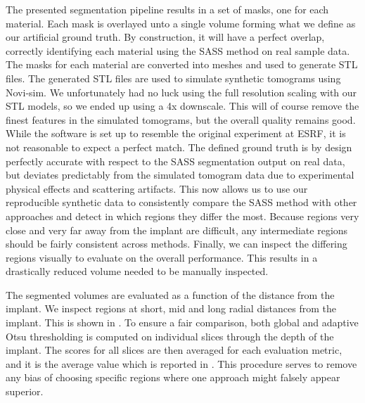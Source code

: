 The presented segmentation pipeline results in a set of masks, one for each
material. Each mask is overlayed unto a single volume forming what we define as
our artificial ground truth. By construction, it will have a perfect overlap,
correctly identifying each material using the SASS method on real sample data.
The masks for each material are converted into meshes and used to generate STL
files.  The generated STL files are used to simulate synthetic tomograms using
Novi-sim. We unfortunately had no luck using the full resolution scaling with
our STL models, so we ended up using a 4x downscale. This will of course remove
the finest features in the simulated tomograms, but the overall quality remains
good. While the software is set up to resemble the original experiment at ESRF,
it is not reasonable to expect a perfect match. The defined ground truth is by
design perfectly accurate with respect to the SASS segmentation output on real
data, but deviates predictably from the simulated tomogram data due to
experimental physical effects and scattering artifacts. This now allows us to
use our reproducible synthetic data to consistently compare the SASS method
with other approaches and detect in which regions they differ the most. Because
regions very close and very far away from the implant are difficult, any
intermediate regions should be fairly consistent across methods.  Finally, we
can inspect the differing regions visually to evaluate on the overall
performance. This results in a drastically reduced volume needed to be manually
inspected.

The segmented volumes are evaluated as a function of the distance from the
implant. We inspect regions at short, mid and long radial distances from the
implant. This is shown in . To ensure a fair comparison, both
global and adaptive Otsu thresholding is computed on individual slices through the depth
of the implant. The scores for all slices are then averaged for each evaluation
metric, and it is the average value which is reported in .
This procedure serves to remove any bias of choosing specific regions where one
approach might falsely appear superior.

